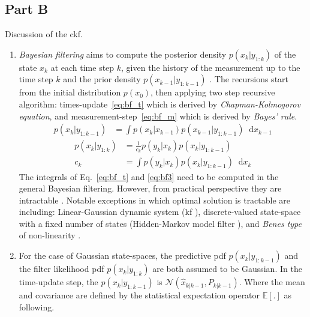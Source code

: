 \documentclass[12pt]{article}
\newcommand*\diff{\mathop{}\!\mathrm{d}}
\begin{document}
\subsection*{Part B}
    Discussion of the \acrfull{ckf}.
    
\begin{enumerate}[label=\arabic*)]

    \item
        \textit{Bayesian filtering} aims to compute the posterior density $p(x_k|y_{1:k})$ of the state $x_k$ at each time step $k$, given the history of the measurement up to the time step $k$ and the prior density $p(x_{k-1}|y_{1:k-1})$ \cite{sarkka2013bayesian}. The recursions start from the initial distribution $p(x_0)$, then applying two step recursive algorithm: times-update~\eqref{eq:bf_t} which is derived by \textit{Chapman-Kolmogorov equation}, and measurement-step~\eqref{eq:bf_m} which is derived by \textit{Bayes' rule}. 
        \begin{align} \label{eq:bf_t}
            p(x_k|y_{1:k-1}) &= \int p (x_k|x_{k-1}) p(x_{k-1}|y_{1:k-1}) \diff{x_{k-1}} 
        \end{align}
        \begin{subequations} \label{eq:bf_m}
        \begin{align}
            p(x_k|y_{1:k}) &= \frac{1}{c_k} p (y_k|x_k) p(x_k|y_{1:k-1}) \label{eq:bf2} \\
            c_k &= \int p (y_k|x_k) p(x_k|y_{1:k-1}) \diff{x_k} \label{eq:bf3}
        \end{align}
        \end{subequations}
        The integrals of Eq.~\eqref{eq:bf_t} and \eqref{eq:bf3} need to be computed in the general Bayesian filtering. However, from practical perspective they are intractable \cite{arasaratnam2009cubature}. Notable exceptions in which optimal solution is tractable are including: Linear-Gaussian dynamic system (\acrshort{kf} \cite{kalman1960new}), discrete-valued state-space with a fixed number of states (Hidden-Markov model filter \cite{liu2008monte}), and \textit{Benes type} of non-linearity \cite{benevs1981exact}. 
    \item 
        For the case of Gaussian state-spaces, the predictive \acrshort{pdf} $p(x_k|y_{1:k-1})$ and the filter likelihood \acrshort{pdf} $p(x_k|y_{1:k})$ are both assumed to be Gaussian.
        In the time-update step, the $p(x_k|y_{1:k-1})$ is $\mathcal{N}(\hat x_{k|k-1},P_{k|k-1})$. Where the mean and covariance are defined by the statistical expectation operator $\mathbb E[.]$ as following.

\end{enumerate}
\end{document}
